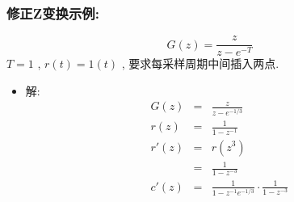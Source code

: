 \documentclass[table]{beamer}
\begin{document}
\begin{frame}
\begin{columns}
\begin{column}{0.5\textwidth}
\begin{block}
\end{block}
\end{column}
\end{columns}
\end{frame}
\begin{frame}
\frametitle{修正Z变换示例:}
\label{sec-5-3}

\[G(z)=\frac{z}{z-e^{-T}}\]
   $T=1$ ,  $r(t)=1(t)$ , 要求每采样周期中间插入两点.

\begin{itemize}
\item 解:
      \begin{eqnarray*}
      G(z) &= & \frac{z}{z-e^{-1/3}} \\
      r(z) &=& \frac{1}{1-z^{-1}} \\
      r'(z) &=& r(z^3) \\
      &=& \frac{1}{1-z^{-3}} \\
      c'(z) &=& \frac{1}{1-z^{-1}e^{-1/3}}\cdot\frac{1}{1-z^{-3}}
      \end{eqnarray*}
\end{itemize}
\end{frame}
\end{document}
